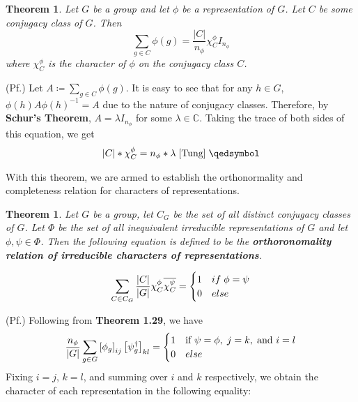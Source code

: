 \documentclass[10pt]{ucthesis}
\newcommand{\C}{\mathbb{C}}
\newtheorem{theorem}[definition]{Theorem}
\begin{document}
\begin{theorem}
	Let $G$ be a group and let $\phi$ be a representation of $G$. Let $C$ be some conjugacy class of $G$. Then 
$$\sum_{g\in C} \phi(g) =\frac{|C|}{n_\phi} \chi^\phi_C I_{n_\phi}$$
where $\chi^\phi_C$ is the character of $\phi$ on the conjugacy class $C$.
\end{theorem}
\noindent (Pf.) Let $A\coloneq \sum_{g\in C} \phi(g)$. It is easy to see that for any $h\in G$, $\phi(h)A\phi(h)^{-1} = A$ due to the nature of conjugacy classes. Therefore, by \textbf{Schur's Theorem}, $A = \lambda I_{n_\phi}$ for some $\lambda \in \C$. Taking the trace of both sides of this equation, we get 
\begin{equation}
	\begin{aligned}
		|C| * \chi_C^\phi = n_\phi * \lambda \hspace{1mm} \cite{Tung} \hspace{1mm} \qedsymbol
	\end{aligned}
\end{equation}

With this theorem, we are armed to establish the orthonormality and completeness relation for characters of representations.

\begin{theorem}
	Let $G$ be a group, let $C_G$ be the set of all distinct conjugacy classes of $G$. Let $\Phi$ be the set of all inequivalent irreducible representations of $G$ and let $\phi,\psi\in\Phi$. Then the following equation is defined to be the \textbf{orthoronomality relation of irreducible characters of representations}.

$$\sum_{C \in C_G} \frac{|C|}{|G|} \chi^{\phi}_C \overline{\chi^{\psi}_C } = \begin{cases}
																1 & if \hspace{1mm} \phi = \psi \\
																0 & else
															\end{cases}$$
\end{theorem}
\noindent (Pf.) Following from \textbf{Theorem 1.29}, we have 
$$\frac{n_\phi}{|G|} \sum_{g\in G} \left[\phi_g \right]_{ij} \left[\psi_g^\dag \right]_{kl} = \begin{cases}
																						1 & \text{if } \psi = \phi,\hspace{1mm} j=k,\hspace{1mm} \text{and } i=l\\
																						0 & else
																					 \end{cases}$$
Fixing $i=j$, $k=l$, and summing over $i$ and $k$ respectively, we obtain the character of each representation in the following equality:
\end{document}
